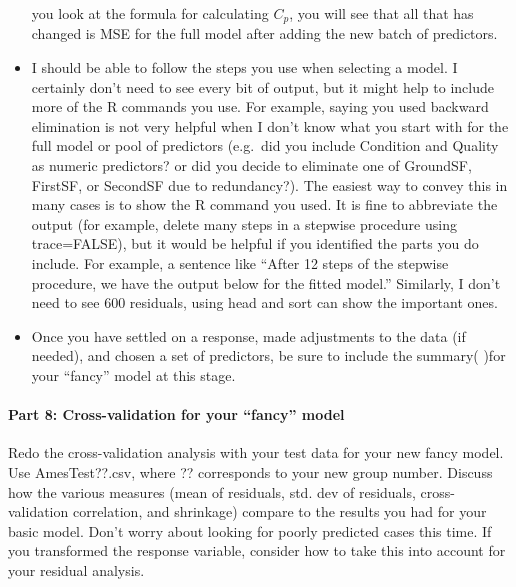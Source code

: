 \documentclass[
]{article}
\begin{document}
\begin{itemize}
  you look at the formula for calculating \(C_{p}\), you will see that
  all that has changed is MSE for the full model after adding the new
  batch of predictors.
\item
  I should be able to follow the steps you use when selecting a model. I
  certainly don't need to see every bit of output, but it might help to
  include more of the R commands you use. For example, saying you used
  backward elimination is not very helpful when I don't know what you
  start with for the full model or pool of predictors (e.g.~did you
  include Condition and Quality as numeric predictors? or did you decide
  to eliminate one of GroundSF, FirstSF, or SecondSF due to
  redundancy?). The easiest way to convey this in many cases is to show
  the R command you used. It is fine to abbreviate the output (for
  example, delete many steps in a stepwise procedure using trace=FALSE),
  but it would be helpful if you identified the parts you do include.
  For example, a sentence like ``After 12 steps of the stepwise
  procedure, we have the output below for the fitted model.'' Similarly,
  I don't need to see 600 residuals, using head and sort can show the
  important ones.
\item
  Once you have settled on a response, made adjustments to the data (if
  needed), and chosen a set of predictors, be sure to include the
  summary( )for your ``fancy'' model at this stage.
\end{itemize}

\hypertarget{part-8-cross-validation-for-your-fancy-model}{%
\paragraph{Part 8: Cross-validation for your ``fancy''
model}\label{part-8-cross-validation-for-your-fancy-model}}

Redo the cross-validation analysis with your test data for your new
fancy model. Use AmesTest??.csv, where ?? corresponds to your new group
number. Discuss how the various measures (mean of residuals, std. dev of
residuals, cross-validation correlation, and shrinkage) compare to the
results you had for your basic model. Don't worry about looking for
poorly predicted cases this time. If you transformed the response
variable, consider how to take this into account for your residual
analysis.
\end{document}
